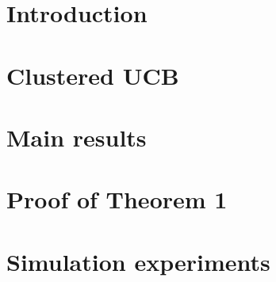 \documentclass[twoside]{article}
\begin{document}
\begin{abstract}

\end{abstract}

\section{Introduction}
\label{sec:intro}


\section{Clustered UCB}
\label{sec:clusucb}


\section{Main results}
\label{sec:results}


\section{Proof of Theorem 1}
\label{sec:proofTheorem}


\section{Simulation experiments}
\label{sec:expts}

\end{document}
